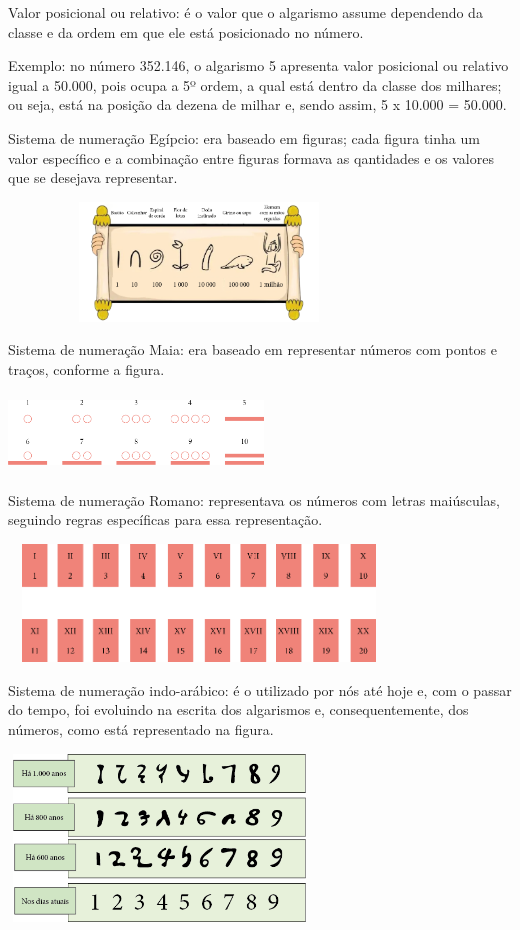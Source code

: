 Valor posicional ou relativo: é o valor que o algarismo assume
dependendo da classe e da ordem em que ele está posicionado no número.

Exemplo: no número 352.146, o algarismo 5 apresenta valor posicional ou
relativo igual a 50.000, pois ocupa a 5º ordem, a qual está dentro da
classe dos milhares; ou seja, está na posição da dezena de milhar e,
sendo assim, 5 x 10.000 = 50.000.

Sistema de numeração Egípcio: era baseado em figuras; cada figura tinha um valor específico e a combinação entre figuras formava as qantidades e os valores que se desejava representar. 

\includegraphics[width=3.98368in,height=1.25011in]{media/image2.png}

Sistema de numeração Maia: era baseado em representar
números com pontos e traços, conforme a figura.

\includegraphics[width=2.66690in,height=0.81674in]{media/image3.png}

Sistema de numeração Romano: representava os números com letras
maiúsculas, seguindo regras específicas para essa representação.

\includegraphics[width=3.97534in,height=1.23344in]{media/image4.png}

Sistema de numeração indo-arábico: é o utilizado por nós
até hoje e, com o passar do tempo, foi evoluindo na escrita dos algarismos e, consequentemente, dos números, como está representado na figura.

\includegraphics[width=3.15027in,height=1.75015in]{media/image5.png}

